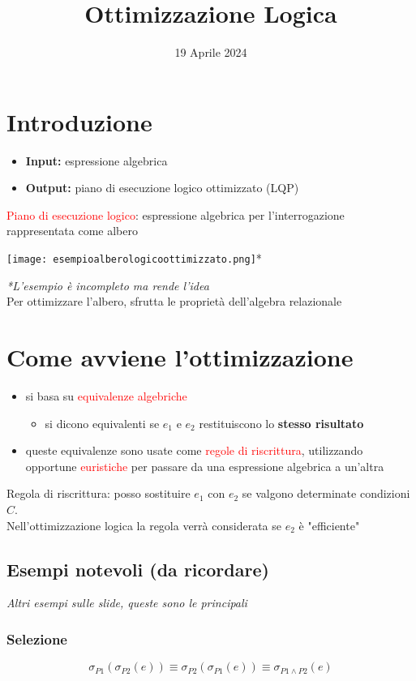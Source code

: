 \documentclass[12pt]{article}
\title{Ottimizzazione Logica}
\date{19 Aprile 2024}
\begin{document}
\maketitle
\section{Introduzione}
\begin{itemize}
    \item \textbf{Input:} espressione algebrica
    \item \textbf{Output:} piano di esecuzione logico ottimizzato (LQP)
\end{itemize}
\textcolor{red}{Piano di esecuzione logico}: espressione algebrica per l'interrogazione rappresentata come albero
\begin{center}
    \texttt{[image: esempioalberologicoottimizzato.png]}*
\end{center}
\textit{*L'esempio è incompleto ma rende l'idea}\\
Per ottimizzare l'albero, sfrutta le proprietà dell'algebra relazionale
\section{Come avviene l'ottimizzazione}
\begin{itemize}
    \item si basa su \textcolor{red}{equivalenze algebriche} \begin{itemize}
        \item si dicono equivalenti se $e_{1}$ e $e_{2}$ restituiscono lo \textbf{stesso risultato}
    \end{itemize}
    \item queste equivalenze sono usate come \textcolor{red}{regole di riscrittura}, utilizzando opportune \textcolor{red}{euristiche} per passare da una espressione algebrica a un'altra
\end{itemize}
Regola di riscrittura: posso sostituire $e_{1}$ con $e_{2}$ se valgono determinate condizioni $C$.\\
Nell'ottimizzazione logica la regola verrà considerata se $e_{2}$ è "efficiente" 
\subsection{Esempi notevoli (da ricordare)}
\textit{Altri esempi sulle slide, queste sono le principali}
\subsubsection{Selezione}
\begin{equation*}
    \sigma_{P1}(\sigma_{P2}(e))\equiv \sigma_{P2}(\sigma_{P1}(e)) \equiv \sigma_{P1 \land P2}(e)
\end{equation*}
\end{document}
